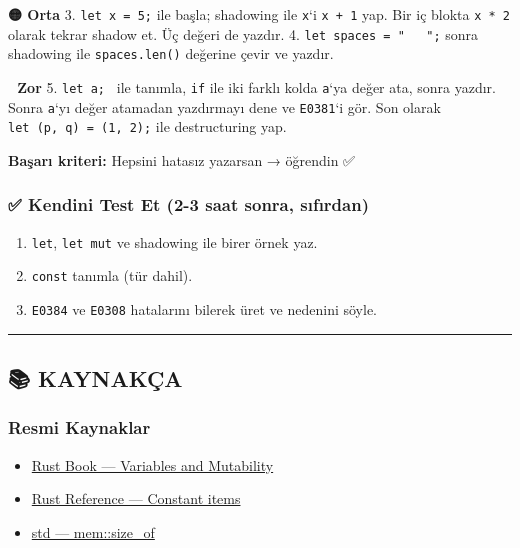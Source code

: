 \documentclass[12pt,a4paper]{article}
\begin{document}
\textbf{🟡 Orta}
3. \texttt{let\ x\ =\ 5;} ile başla; shadowing ile \texttt{x}`i \texttt{x\ +\ 1} yap. Bir iç blokta \texttt{x\ *\ 2} olarak tekrar shadow et. Üç değeri de yazdır.
4. \texttt{let\ spaces\ =\ "\ \ \ ";} sonra shadowing ile \texttt{spaces.len()} değerine çevir ve yazdır.

\textbf{🔴 Zor}
5. \texttt{let\ a;\ } ile tanımla, \texttt{if} ile iki farklı kolda \texttt{a}`ya değer ata, sonra yazdır. Sonra \texttt{a}`yı değer atamadan yazdırmayı dene ve \texttt{E0381}`i gör. Son olarak \texttt{let\ (p,\ q)\ =\ (1,\ 2);} ile destructuring yap.

\textbf{Başarı kriteri:} Hepsini hatasız yazarsan → öğrendin ✅

\subsubsection{✅ Kendini Test Et (2-3 saat sonra, sıfırdan)}\label{kendini-test-et-2-3-saat-sonra-sıfırdan-2}

\begin{enumerate}
\def\labelenumi{\arabic{enumi}.}
\tightlist
\item
  \texttt{let}, \texttt{let\ mut} ve shadowing ile birer örnek yaz.
\item
  \texttt{const} tanımla (tür dahil).
\item
  \texttt{E0384} ve \texttt{E0308} hatalarını bilerek üret ve nedenini söyle.
\end{enumerate}

\begin{center}\rule{0.5\linewidth}{0.5pt}\end{center}

\subsection{📚 KAYNAKÇA}\label{kaynakça-2}

\subsubsection{Resmi Kaynaklar}\label{resmi-kaynaklar-2}

\begin{itemize}
\tightlist
\item
  \href{https://doc.rust-lang.org/book/ch03-01-variables-and-mutability.html}{Rust Book --- Variables and Mutability}
\item
  \href{https://doc.rust-lang.org/reference/items/constant-items.html}{Rust Reference --- Constant items}
\item
  \href{https://doc.rust-lang.org/std/mem/fn.size_of.html}{std --- mem::size\_of}
\end{itemize}
\end{document}
